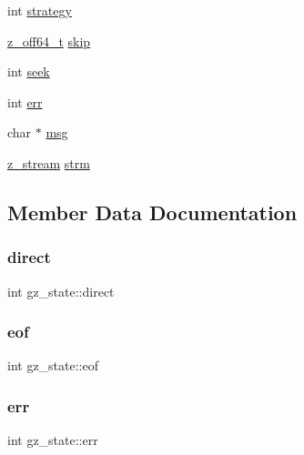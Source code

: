 \begin{DoxyCompactItemize}
\item 
int \mbox{\hyperlink{structgz__state_a2777c46311012def486c2aa720fe5203}{strategy}}
\item 
\mbox{\hyperlink{ZlibCrc32_8h_ab9923767082c7a76924b31493e60d42c}{z\+\_\+off64\+\_\+t}} \mbox{\hyperlink{structgz__state_a4bc336eac6a48fd0f2645e672e5c6c13}{skip}}
\item 
int \mbox{\hyperlink{structgz__state_ab60b82012b8193c3f44b2e48974b9dd9}{seek}}
\item 
int \mbox{\hyperlink{structgz__state_aa9832eb9300c065f6572e5699ab27938}{err}}
\item 
char $\ast$ \mbox{\hyperlink{structgz__state_ad49f321739e10ff0387a0e7fe31c6538}{msg}}
\item 
\mbox{\hyperlink{ZlibCrc32_8h_afa60092f4e0b9bc4f23b41c6930463f0}{z\+\_\+stream}} \mbox{\hyperlink{structgz__state_a77df647f4deba86cc8a4fa0a01a08f4e}{strm}}
\end{DoxyCompactItemize}


\subsection{Member Data Documentation}
\mbox{\label{structgz__state_a114c6a0de43039853ead48a092792a7d}} 
\subsubsection{\texorpdfstring{direct}{direct}}
{\footnotesize\ttfamily int gz\+\_\+state\+::direct}

\mbox{\label{structgz__state_ae50ffc823858bc4f909e3d9507356f92}} 
\subsubsection{\texorpdfstring{eof}{eof}}
{\footnotesize\ttfamily int gz\+\_\+state\+::eof}

\mbox{\label{structgz__state_aa9832eb9300c065f6572e5699ab27938}} 
\subsubsection{\texorpdfstring{err}{err}}
{\footnotesize\ttfamily int gz\+\_\+state\+::err}

